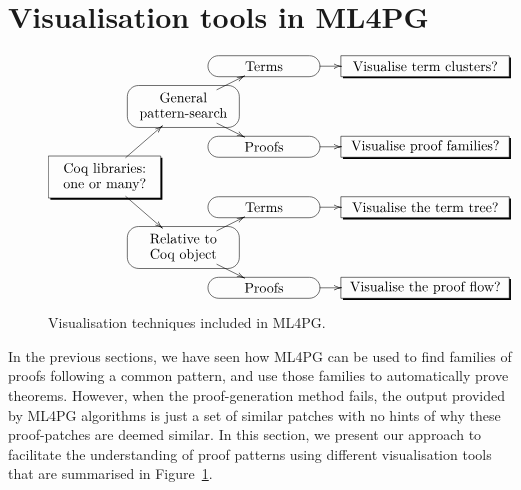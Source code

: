 \section{Visualisation tools in ML4PG}\label{sec:visualisation}



\begin{figure}
 
$$
\xy0;/r.12pc/: 
*[o]=<80pt,30pt>\hbox{\txt{Coq libraries:\\one or many?}}="a"*\frm<8pt>{-,},
(40,35)*[o]=<80pt,30pt>\hbox{\txt{General\\pattern-search}}="r"*\frm<8pt>{-},
(40,-35)*[o]=<80pt,30pt>\hbox{\txt{Relative to\\ Coq object}}="b"*\frm<8pt>{-},
(80,55)*[o]=<80pt,15pt>\hbox{\txt{Terms}}="c"*\frm<8pt>{-},
(80,15)*[o]=<80pt,15pt>\hbox{\txt{Proofs}}="d"*\frm<8pt>{-},
(80,-15)*[o]=<80pt,15pt>\hbox{\txt{Terms}}="e"*\frm<8pt>{-},
(80,-55)*[o]=<80pt,15pt>\hbox{\txt{Proofs}}="f"*\frm<8pt>{-},
(160,55)*[o]=<120pt,15pt>\hbox{\txt{Visualise term clusters?}}="g"*\frm<8pt>{-,},
(160,15)*[o]=<120pt,15pt>\hbox{\txt{Visualise proof families?}}="h"*\frm<8pt>{-,},
(160,-15)*[o]=<120pt,15pt>\hbox{\txt{Visualise the term tree?}}="i"*\frm<8pt>{-,},
(160,-55)*[o]=<120pt,15pt>\hbox{\txt{Visualise the proof flow?}}="j"*\frm<8pt>{-,},
"a";"b" **\dir{-} ?>*\dir{>},
"a";"r" **\dir{-} ?>*\dir{>},
"r";"c" **\dir{-} ?>*\dir{>},
"r";"d" **\dir{-} ?>*\dir{>},
"b";"e" **\dir{-} ?>*\dir{>},
"b";"f" **\dir{-} ?>*\dir{>},
"c";"g" **\dir{-} ?>*\dir{>},
"d";"h" **\dir{-} ?>*\dir{>},
"e";"i" **\dir{-} ?>*\dir{>},
"f";"j" **\dir{-} ?>*\dir{>},
\endxy
$$
\caption{Visualisation techniques included in ML4PG.}\label{fig:visualisation}
\end{figure}


In the previous sections, we have seen how ML4PG can be used to find families of proofs following 
a common pattern, and use those families to automatically prove theorems. However, when the proof-generation
method fails, the output provided by ML4PG algorithms is just a set of similar patches with no hints of why 
these proof-patches are deemed similar. 
In this section, we present our approach to facilitate the understanding of proof patterns using different visualisation tools
that are summarised in Figure~\ref{fig:visualisation}.

